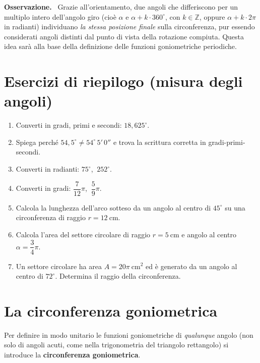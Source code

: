\documentclass[11pt,a4paper]{article}
\newenvironment{osservazione}{%
  \par\vspace{4pt}\noindent
  \textbf{\color{orange!70!black}Osservazione.}\ 
}{%
  \par\vspace{4pt}
}
\begin{document}
\begin{osservazione}
Grazie all'orientamento, due angoli che differiscono per un multiplo intero dell'angolo giro (cio\`e $\alpha$ e $\alpha + k\cdot 360^\circ$, con $k \in \mathbb{Z}$, oppure $\alpha + k\cdot 2\pi$ in radianti) individuano \emph{la stessa posizione finale} sulla circonferenza, pur essendo considerati angoli distinti dal punto di vista della rotazione compiuta. Questa idea sar\`a alla base della definizione delle funzioni goniometriche periodiche.
\end{osservazione}

\section{Esercizi di riepilogo (misura degli angoli)}

\begin{enumerate}[label=\arabic*)]
\item Converti in gradi, primi e secondi: $18{,}625^\circ$.
\item Spiega perch\'e $54{,}5^\circ \neq 54^\circ\,5'\,0''$ e trova la scrittura corretta in gradi-primi-secondi.
\item Converti in radianti: $75^\circ$, $\ 252^\circ$.
\item Converti in gradi: $\dfrac{7}{12}\pi$, $\ \dfrac{5}{9}\pi$.
\item Calcola la lunghezza dell'arco sotteso da un angolo al centro di $45^\circ$ su una circonferenza di raggio $r = 12\ \text{cm}$.
\item Calcola l'area del settore circolare di raggio $r = 5\ \text{cm}$ e angolo al centro $\alpha = \dfrac{3}{4}\pi$.
\item Un settore circolare ha area $A = 20\pi\ \text{cm}^2$ ed \`e generato da un angolo al centro di $72^\circ$. Determina il raggio della circonferenza.
\end{enumerate}

\section{La circonferenza goniometrica}

Per definire in modo unitario le funzioni goniometriche di \emph{qualunque} angolo (non solo di angoli acuti, come nella trigonometria del triangolo rettangolo) si introduce la \textbf{circonferenza goniometrica}.

\begin{center}
\end{center}
\end{document}
